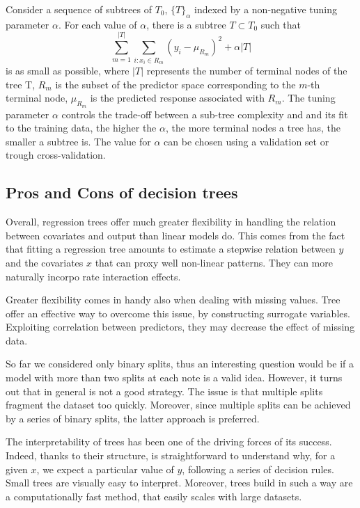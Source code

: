 \documentclass[a4paper,11pt]{article}
\begin{document}
Consider a sequence of subtrees of $T_0$, $\{T\}_\alpha$ indexed by a non-negative tuning parameter $\alpha$.
For each value of $\alpha$, there is a subtree $T \subset T_0$ such that
$$\sum_{m=1}^{|T|} \sum_{i : x_i \in R_m} \left( y_i - \mu_{R_m} \right)^2 + \alpha |T|$$
is as small as possible, where $|T|$ represents the number of terminal nodes of the tree T, $R_m$ is the subset of the predictor space corresponding to the $m$-th terminal node, $\mu_{R_m}$ is the predicted response associated with $R_m$.
The tuning parameter $\alpha$ controls the trade-off between a sub-tree complexity and and its fit to the training data, the higher the $\alpha$, the more terminal nodes a tree has, the smaller a subtree is.
The value for $\alpha$ can be chosen using a validation set or trough cross-validation.

\subsection{Pros and Cons of decision trees}
Overall, regression trees offer much greater flexibility in handling the relation between covariates and output than linear models do. This comes from the fact that fitting a regression tree amounts to estimate a stepwise relation between $y$ and the covariates $x$ that can proxy well non-linear patterns. They can more naturally incorpo
rate interaction effects. 

Greater flexibility comes in handy also when dealing with missing values. Tree offer an effective way to overcome this issue, by constructing surrogate variables. Exploiting correlation between predictors, they may decrease the effect of missing data. 

So far we considered only binary splits, thus an interesting question would be if a model with more than two splits at each note is a valid idea. However, it turns out that in general is not a good strategy. The issue is that multiple splits fragment the dataset too quickly. Moreover, since multiple splits can be achieved by a series of binary splits, the latter approach is preferred.

The interpretability of trees has been one of the driving forces of its success. Indeed, thanks to their structure, is straightforward to understand why, for a given $x$, we expect a particular value of $y$, following a series of decision rules. Small trees are visually easy to interpret. Moreover, trees build in such a way are a computationally fast method, that easily scales with large datasets.
\end{document}
